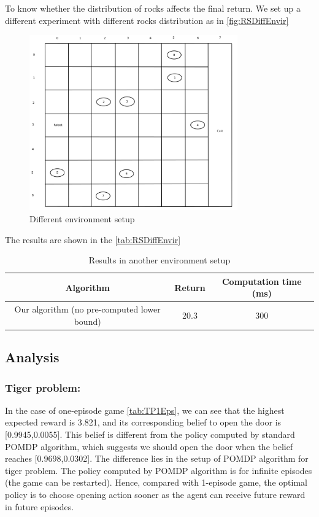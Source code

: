 \documentclass{article}
\begin{document}
To know whether the distribution of rocks affects the final return. We set up a different
experiment with different rocks distribution as in \autoref{fig:RSDiffEnvir}

\begin{figure}[H]
\centering
\includegraphics[width=0.8\textwidth]{Diff-Envir-Rock-Sample.png}
\caption{Different environment setup}
\label{fig:RSDiffEnvir}
\end{figure}

The results are shown in the \autoref{tab:RSDiffEnvir}

\begin{table}[H]
\begin{center}
	\begin{tabular} {| c | c | c |}
		\hline \hline
		Algorithm & Return & Computation time (ms) \\
		\hline
		Our algorithm (no pre-computed lower bound) & 20.3 & 300 \\
		\hline \hline
	\end{tabular}
\end{center}
\caption{Results in another environment setup}
\label{tab:RSDiffEnvir}
\end{table}


\subsection{Analysis}

\subsubsection{Tiger problem:} 
In the case of one-episode game \autoref{tab:TP1Eps}, we can see that the highest 
expected reward is 3.821, and its
corresponding belief to open the door is [0.9945,0.0055]. This belief is different from
the policy computed by standard POMDP algorithm, which suggests we should open the door
when the belief reaches [0.9698,0.0302]. The difference lies in the setup of POMDP algorithm 
for tiger problem. The policy computed by POMDP algorithm is for infinite episodes (the game
can be restarted). Hence, compared with 1-episode game, the optimal policy is to choose
opening action sooner as the agent can receive future reward in future episodes.
\end{document}
